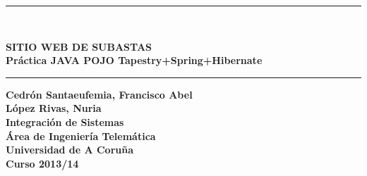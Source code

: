 \documentclass[12pt,a4paper,twoside,spanish]{article}      %
\begin{document}
\def\chaptername{Capítulo}
\chapterfont{\LARGE\raggedleft}

\pagestyle{empty}

\begin{titlepage}
\setlength{\parindent}{0cm} \setlength{\parskip}{0cm}


\newcommand{\HRule}{\rule{\linewidth}{1mm}}

\vspace*{1.5cm}
\HRule \\[0.5cm]
\begin{center}
\textsf{\textbf{\Large SITIO WEB DE SUBASTAS \\[0.25cm] Práctica JAVA POJO Tapestry+Spring+Hibernate \\[0.5cm]}}
\HRule \vspace*{3cm}

\textsf{\textbf{\normalsize
Cedrón Santaeufemia, Francisco Abel\\
López Rivas, Nuria\\[4cm]
Integración de Sistemas\\
Área de Ingeniería Telemática\\ Universidad de A Coruña \\ Curso
2013/14}}
\end{center}
\end{titlepage}

\cleardoublepage


\tableofcontents
\cleardoublepage



 \pagestyle{myheadings}

\setlength{\parindent}{1,5cm} \setlength{\parskip}{0,7cm}
\end{document}
